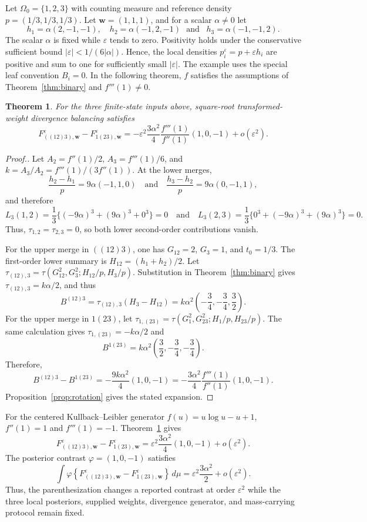 \documentclass[11pt]{article}
\theoremstyle{plain}
\newtheorem{theorem}{Theorem}
\theoremstyle{definition}
\theoremstyle{definition}
\newcommand{\eps}{\varepsilon}
\newcommand{\wv}{\mathbf w}
\newcommand{\Fw}[1]{F_{#1,\wv}^{\eps}}
\begin{document}
Let $\Omega_0=\{1,2,3\}$ with counting measure and reference density $p=(1/3,1/3,1/3)$. Let $\wv=(1,1,1)$, and for a scalar $\alpha\ne0$ let
\[
h_1=\alpha(2,-1,-1),\quad
h_2=\alpha(-1,2,-1) \,\,\,\,\text{and}\,\,\,\,\,
h_3=\alpha(-1,-1,2).
\]
The scalar $\alpha$ is fixed while $\eps$ tends to zero. Positivity holds under the conservative sufficient bound $|\eps|<1/(6|\alpha|)$. Hence, the local densities $p_i^\eps=p+\eps h_i$ are positive and sum to one for sufficiently small $|\eps|$. The example uses the special leaf convention $B_i=0$. In the following theorem, $f$ satisfies the assumptions of Theorem~\ref{thm:binary} and $f'''(1)\ne0$.

\begin{theorem}\label{thm:witness}
For the three finite-state inputs above, square-root transformed-weight divergence balancing satisfies
\[
\Fw{((12)3)}-\Fw{1(23)}
=-\eps^2\frac{3\alpha^2}{4}\frac{f'''(1)}{f''(1)}(1,0,-1)+o(\eps^2).
\]
\end{theorem}

\begin{proof}[Proof.]
Let $A_2=f''(1)/2$, $A_3=f'''(1)/6$, and $k=A_3/A_2=f'''(1)/(3f''(1))$. At the lower merges,
\[\frac{h_2-h_1}{p}=9\alpha(-1,1,0)
\quad\text{and}\quad
\frac{h_3-h_2}{p}=9\alpha(0,-1,1),\]
and therefore
\[L_3(1,2)=\frac13\{(-9\alpha)^3+(9\alpha)^3+0^3\}=0\quad\text{and}\quad
L_3(2,3)=\frac13\{0^3+(-9\alpha)^3+(9\alpha)^3\}=0.\]
Thus, $\tau_{1,2}=\tau_{2,3}=0$, so both lower second-order contributions vanish.

For the upper merge in $((12)3)$, one has $G_{12}=2$, $G_3=1$, and $t_0=1/3$. The first-order lower summary is $H_{12}=(h_1+h_2)/2$. Let $\tau_{(12),3}=\tau(G_{12}^2,G_3^2;H_{12}/p,H_3/p)$. Substitution in Theorem~\ref{thm:binary} gives $\tau_{(12),3}=k\alpha/2$, and thus
\[B^{(12)3}=\tau_{(12),3}(H_3-H_{12})
=k\alpha^2\left(-\frac34,-\frac34,\frac32\right).
\]
For the upper merge in $1(23)$, let $\tau_{1,(23)}=\tau(G_1^2,G_{23}^2;H_1/p,H_{23}/p)$. The same calculation gives $\tau_{1,(23)}=-k\alpha/2$ and
\[
B^{1(23)}=k\alpha^2\left(\frac32,-\frac34,-\frac34\right).
\]
Therefore,
\[
B^{(12)3}-B^{1(23)}
=-\frac{9k\alpha^2}{4}(1,0,-1)
=-\frac{3\alpha^2}{4}\frac{f'''(1)}{f''(1)}(1,0,-1).
\]
Proposition~\ref{prop:rotation} gives the stated expansion.
\end{proof}


For the centered Kullback--Leibler generator $f(u)=u\log u-u+1$, $f''(1)=1$ and $f'''(1)=-1$. Theorem~\ref{thm:witness} gives
\[
\Fw{((12)3)}-\Fw{1(23)}
=\eps^2\frac{3\alpha^2}{4}(1,0,-1)+o(\eps^2).
\]
The posterior contrast $\varphi=(1,0,-1)$ satisfies
\[
\int \varphi \left\{ \Fw{((12)3)}-\Fw{1(23)}\right\}\,d\mu
=\eps^2\frac{3\alpha^2}{2}+o(\eps^2).
\]
Thus, the parenthesization changes a reported contrast at order $\eps^2$ while the three local posteriors, supplied weights, divergence generator, and mass-carrying protocol remain fixed.
\end{document}
